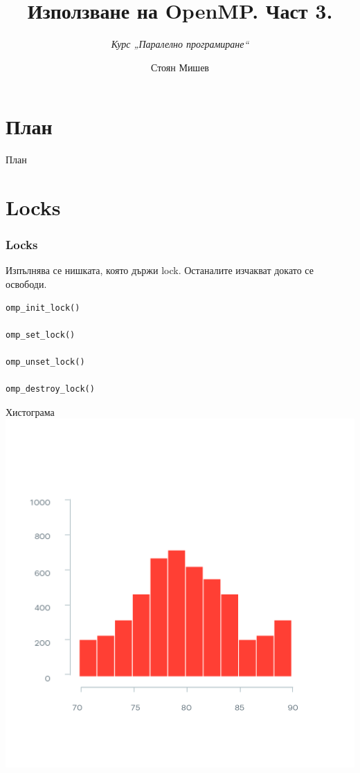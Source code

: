 \documentclass{beamer}
\title{Използване на OpenMP. Част 3.}
\subtitle{\textit{Курс „Паралелно програмиране“}}
\author{\newline \newline Стоян Мишев}
\date{} %
\begin{document}
\lstset{language=Python}
{ 
\frame{\titlepage}}


\section*{План}\begin{frame}{План}\tableofcontents\end{frame}


\section{Locks}

\begin{frame}[fragile]
  \frametitle{Locks}

  Изпълнява се нишката, която държи lock. Останалите изчакват докато се освободи. 

\begin{verbatim}
omp_init_lock()

omp_set_lock()

omp_unset_lock()

omp_destroy_lock()
\end{verbatim}
\end{frame}

\begin{frame}[plain]{Хистограма}
\includegraphics[width=\textwidth]{histogram}  
\end{frame}
\end{document}
